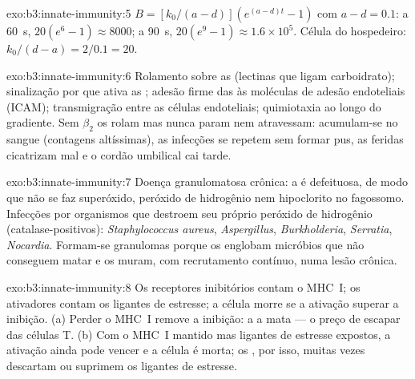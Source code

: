\begin{solution}{exo:b3:innate-immunity:5}
$B = [k_{0}/(a-d)](e^{(a-d)t} - 1)$ com $a - d = 0.1$: a \qty{60}{s},
$20(e^{6} - 1) \approx 8000$; a \qty{90}{s}, $20(e^{9} - 1) \approx
1.6\times 10^{5}$. Célula do hospedeiro: $k_{0}/(d - a) = 2/0.1 = 20$.
\end{solution}

\begin{solution}{exo:b3:innate-immunity:6}
Rolamento sobre as  (lectinas que ligam carboidrato);
sinalização por  que ativa as ; adesão firme das
 às moléculas de adesão endoteliais (ICAM); transmigração
entre as células endoteliais; quimiotaxia ao longo do gradiente. Sem
 $\beta_{2}$ os  rolam mas nunca param nem
atravessam: acumulam-se no sangue (contagens altíssimas), as infecções
se repetem sem formar pus, as feridas cicatrizam mal e o cordão
umbilical cai tarde.
\end{solution}

\begin{solution}{exo:b3:innate-immunity:7}
Doença granulomatosa crônica: a  é defeituosa, de modo que
não se faz superóxido, peróxido de hidrogênio nem hipoclorito no
fagossomo. Infecções por organismos que destroem seu próprio peróxido
de hidrogênio (catalase-positivos): \emph{Staphylococcus aureus},
\emph{Aspergillus}, \emph{Burkholderia}, \emph{Serratia},
\emph{Nocardia}. Formam-se granulomas porque os  englobam
micróbios que não conseguem matar e os muram, com recrutamento
contínuo, numa lesão crônica.
\end{solution}

\begin{solution}{exo:b3:innate-immunity:8}
Os receptores inibitórios contam o MHC~I; os ativadores contam os
ligantes de estresse; a célula morre se a ativação superar a inibição.
(a) Perder o MHC~I remove a inibição: a  a mata ---
o preço de escapar das células T. (b) Com o MHC~I mantido mas ligantes
de estresse expostos, a ativação ainda pode vencer e a célula é morta;
os , por isso, muitas vezes descartam ou suprimem os ligantes de
estresse.
\end{solution}

